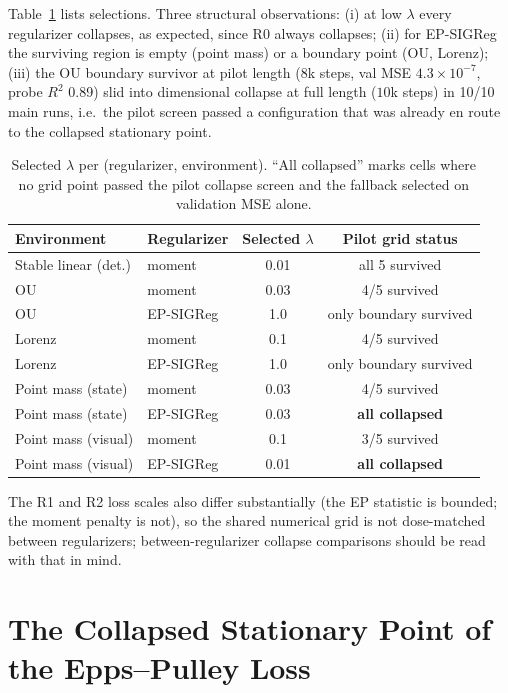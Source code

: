 Table~\ref{tab:lambda} lists selections. Three structural observations: (i) at low $\lambda$ every regularizer collapses, as expected, since R0 always collapses; (ii) for EP-SIGReg the surviving region is empty (point mass) or a boundary point (OU, Lorenz); (iii) the OU boundary survivor at pilot length ($8$k steps, val MSE $4.3\times10^{-7}$, probe $R^2$ 0.89) slid into dimensional collapse at full length ($10$k steps) in 10/10 main runs, i.e.\ the pilot screen passed a configuration that was already en route to the collapsed stationary point.

\begin{table}[h]
\centering
\caption{Selected $\lambda$ per (regularizer, environment). ``All collapsed'' marks cells where no grid point passed the pilot collapse screen and the fallback selected on validation MSE alone.}
\label{tab:lambda}
\small
\begin{tabular}{llcc}
\toprule
Environment & Regularizer & Selected $\lambda$ & Pilot grid status \\
\midrule
Stable linear (det.) & moment & 0.01 & all 5 survived \\
OU & moment & 0.03 & 4/5 survived \\
OU & EP-SIGReg & 1.0 & only boundary survived \\
Lorenz & moment & 0.1 & 4/5 survived \\
Lorenz & EP-SIGReg & 1.0 & only boundary survived \\
Point mass (state) & moment & 0.03 & 4/5 survived \\
Point mass (state) & EP-SIGReg & 0.03 & \textbf{all collapsed} \\
Point mass (visual) & moment & 0.1 & 3/5 survived \\
Point mass (visual) & EP-SIGReg & 0.01 & \textbf{all collapsed} \\
\bottomrule
\end{tabular}
\end{table}

The R1 and R2 loss scales also differ substantially (the EP statistic is bounded; the moment penalty is not), so the shared numerical grid is not dose-matched between regularizers; between-regularizer collapse comparisons should be read with that in mind.

\section{The Collapsed Stationary Point of the Epps--Pulley Loss}
\label{app:stationary}

